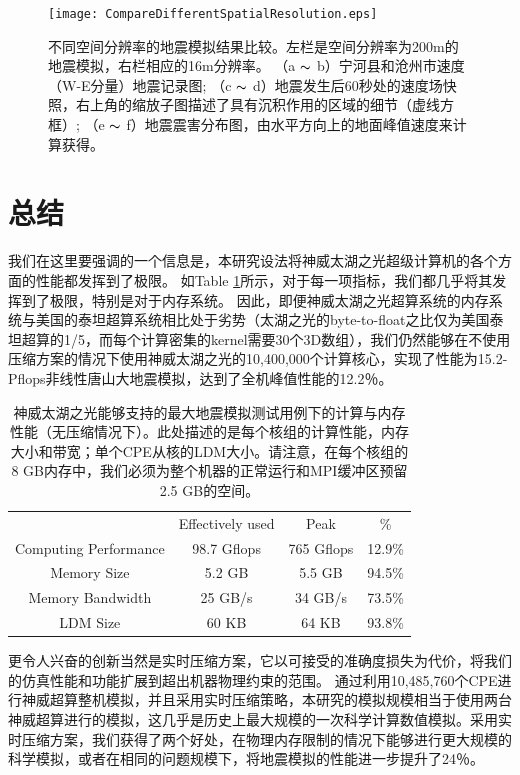 \documentclass[degree=doctor]{thuthesis}
\begin{document}
\begin{figure}[t]
  \centering
  \texttt{[image: CompareDifferentSpatialResolution.eps]}\\
  \caption{
不同空间分辨率的地震模拟结果比较。左栏是空间分辨率为200m的地震模拟，右栏相应的16m分辨率。 （a $ \thicksim $ b）宁河县和沧州市速度（W-E分量）地震记录图; （c $ \thicksim $ d）地震发生后60秒处的速度场快照，右上角的缩放子图描述了具有沉积作用的区域的细节（虚线方框）; （e $ \thicksim $ f）地震震害分布图，由水平方向上的地面峰值速度来计算获得。}
  \label{fig:strong_motion}
\end{figure}


\section{总结}

我们在这里要强调的一个信息是，本研究设法将神威太湖之光超级计算机的各个方面的性能都发挥到了极限。 如Table \ref{tb:push-limit}所示，对于每一项指标，我们都几乎将其发挥到了极限，特别是对于内存系统。 因此，即便神威太湖之光超算系统的内存系统与美国的泰坦超算系统相比处于劣势（太湖之光的byte-to-float之比仅为美国泰坦超算的1/5，而每个计算密集的kernel需要30个3D数组），我们仍然能够在不使用压缩方案的情况下使用神威太湖之光的10,400,000个计算核心，实现了性能为15.2-Pflops非线性唐山大地震模拟，达到了全机峰值性能的12.2％。

\begin{table}[!t]
\caption{
神威太湖之光能够支持的最大地震模拟测试用例下的计算与内存性能（无压缩情况下）。此处描述的是每个核组的计算性能，内存大小和带宽；单个CPE从核的LDM大小。请注意，在每个核组的8 GB内存中，我们必须为整个机器的正常运行和MPI缓冲区预留2.5 GB的空间。}
\label{tb:push-limit}
\centering
\begin{tabular}{cccc}
\hline\hline
  & Effectively used & Peak & \% \\

  Computing Performance & 98.7 Gflops & 765 Gflops & 12.9\% \\
  Memory Size & 5.2 GB & 5.5 GB & 94.5\% \\
  Memory Bandwidth & 25 GB/s & 34 GB/s & 73.5\% \\
  LDM Size & 60 KB & 64 KB & 93.8\% \\\hline
\hline
\end{tabular}
\end{table}

更令人兴奋的创新当然是实时压缩方案，它以可接受的准确度损失为代价，将我们的仿真性能和功能扩展到超出机器物理约束的范围。 通过利用10,485,760个CPE进行神威超算整机模拟，并且采用实时压缩策略，本研究的模拟规模相当于使用两台神威超算进行的模拟，这几乎是历史上最大规模的一次科学计算数值模拟。采用实时压缩方案，我们获得了两个好处，在物理内存限制的情况下能够进行更大规模的科学模拟，或者在相同的问题规模下，将地震模拟的性能进一步提升了24％。
\end{document}
